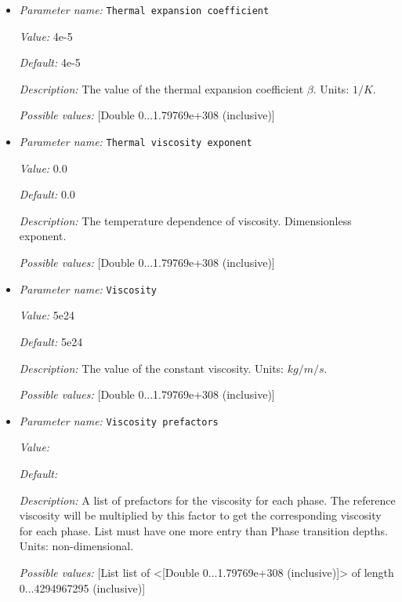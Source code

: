 \begin{itemize}
{\it Description:} The value of the thermal conductivity $k$. Units: $W/m/K$.


{\it Possible values:} [Double 0...1.79769e+308 (inclusive)]
\item {\it Parameter name:} {\tt Thermal expansion coefficient}


{\it Value:} 4e-5


{\it Default:} 4e-5


{\it Description:} The value of the thermal expansion coefficient $\beta$. Units: $1/K$.


{\it Possible values:} [Double 0...1.79769e+308 (inclusive)]
\item {\it Parameter name:} {\tt Thermal viscosity exponent}


{\it Value:} 0.0


{\it Default:} 0.0


{\it Description:} The temperature dependence of viscosity. Dimensionless exponent.


{\it Possible values:} [Double 0...1.79769e+308 (inclusive)]
\item {\it Parameter name:} {\tt Viscosity}


{\it Value:} 5e24


{\it Default:} 5e24


{\it Description:} The value of the constant viscosity. Units: $kg/m/s$.


{\it Possible values:} [Double 0...1.79769e+308 (inclusive)]
\item {\it Parameter name:} {\tt Viscosity prefactors}


{\it Value:} 


{\it Default:} 


{\it Description:} A list of prefactors for the viscosity for each phase. The reference viscosity will be multiplied by this factor to get the corresponding viscosity for each phase. List must have one more entry than Phase transition depths. Units: non-dimensional.


{\it Possible values:} [List list of <[Double 0...1.79769e+308 (inclusive)]> of length 0...4294967295 (inclusive)]
\end{itemize}

